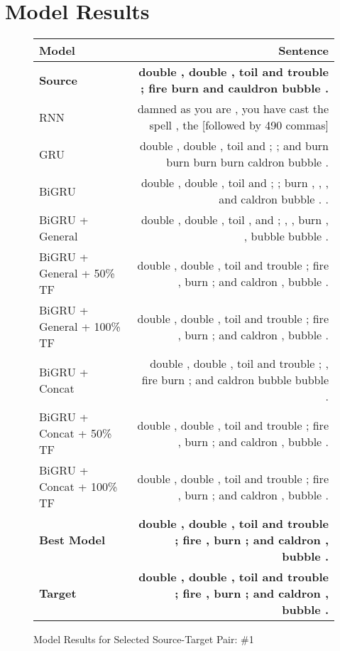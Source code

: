 \documentclass[twoside,twocolumn]{article}
\newlength\mystoreparindent
\newenvironment{myparindent}[1]{%
  \setlength{\mystoreparindent}{\the\parindent}
  \setlength{\parindent}{#1}
  }{%
  \setlength{\parindent}{\mystoreparindent}
}
\begin{document}
\begin{myparindent}{0pt}
\section{Model Results}
\label{app:model-results}
\begin{figure}[ht!]
    \centering
    \begin{tabular}{ |l|r| }
        \hline
        \textbf{Model}
          & \textbf{Sentence} \\
        \hline
        \textbf{Source} & \textbf{double , double , toil and trouble ; fire burn and cauldron bubble .} \\ \hline
        RNN & damned as you are , you have cast the spell , the [followed by 490 commas] \\ \hline
        GRU & double , double , toil and ; ; and burn burn burn burn caldron bubble . \\ \hline
        BiGRU & double , double , toil and ; ; burn , , , and caldron bubble . . \\ \hline
        BiGRU + General & double , double , toil , and ; , , burn , , bubble bubble . \\ \hline
        BiGRU + General + 50\% TF & double , double , toil and trouble ; fire , burn ; and caldron , bubble . \\ \hline
        BiGRU + General + 100\% TF & double , double , toil and trouble ; fire , burn ; and caldron , bubble . \\ \hline
        BiGRU + Concat & double , double , toil and trouble ; , fire burn ; and caldron bubble bubble . \\ \hline
        BiGRU + Concat + 50\% TF & double , double , toil and trouble ; fire , burn ; and caldron , bubble . \\ \hline
        BiGRU + Concat + 100\% TF & double , double , toil and trouble ; fire , burn ; and caldron , bubble . \\ \hline
        \textbf{Best Model} & \textbf{double , double , toil and trouble ; fire , burn ; and caldron , bubble .} \\ \hline
        \textbf{Target} & \textbf{double , double , toil and trouble ; fire , burn ; and caldron , bubble .} \\ \hline
    \end{tabular}
    \caption{Model Results for Selected Source-Target Pair: \#1}
    \label{fig:model-results-1}
\end{figure}


\end{myparindent}
\end{document}
